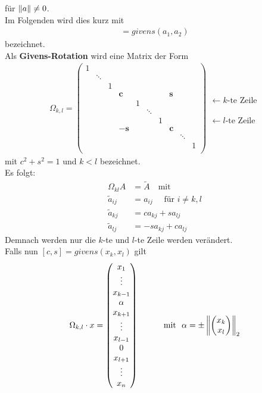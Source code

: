 für $\left\| a \right\|\neq 0$.\\
Im Folgenden wird dies kurz mit
\begin{gather*}
  [c,s] = givens(a_1, a_2)
\end{gather*}
bezeichnet. \\
Als \textbf{Givens-Rotation} wird eine Matrix der Form
\begin{gather}
  \Omega _{k,l} = \begin{pmatrix}
    1 &&&&&&&&& \\
    & \ddots\\
    && 1\\
    &&& \mathbf{c} &&&& \mathbf{s} \\
    &&&& 1\\
    &&&&& \ddots \\
    &&&&&& 1\\
    &&& -\mathbf{s} &&&& \mathbf{c} \\
    &&&&&&&& \ddots \\
    &&&&&&&&& 1\\
  \end{pmatrix}
  \begin{array}{l}
    \\   \leftarrow \text{$k$-te Zeile}
    \\ \\ \\ \\ \leftarrow \text{$l$-te Zeile}
  \end{array}
  \label{IV.4.5}
\end{gather}
mit $c^2+s^2=1$ und $k<l$ bezeichnet.\\
Es folgt:
\begin{align*}
  \Omega_{kl} A &= \widetilde{A} \quad \text{mit} \\
  \widetilde{a}_{ij}  &= a_{ij} \quad \text{ für } i\neq k,l \\
  \widetilde{a}_{kj} & = ca_{kj}+sa_{lj} \\
  \widetilde{a}_{lj} & = -sa_{kj} + ca_{lj}
\end{align*}
Demnach werden nur die $k$-te und $l$-te Zeile werden verändert. \\
Falls nun $[c,s] = givens(x_k, x_l)$ gilt
\begin{gather}
  \Omega_{k,l}\cdot x = \begin{pmatrix}
    x_1 \\ \vdots \\x_{k-1} \\\alpha \\ x_{k+1}
    \\\vdots \\
    x_{l-1} \\ 0 \\x_{l+1} \\\vdots \\x_n
  \end{pmatrix}
  \qquad
  \quad \text{mit~~}
  \alpha = \pm \left\|   \begin{pmatrix} x_k \\ x_l\end{pmatrix} \right\|_2
  \label{IV.4.6}
\end{gather}
